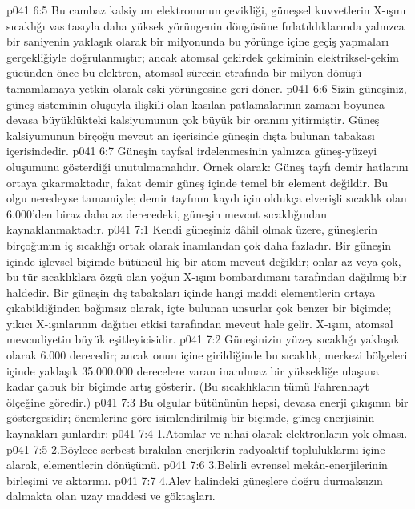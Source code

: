 \vs p041 6:5 Bu cambaz kalsiyum elektronunun çevikliği, güneşsel kuvvetlerin X\hyp{}ışını sıcaklığı vasıtasıyla daha yüksek yörüngenin döngüsüne fırlatıldıklarında yalnızca bir saniyenin yaklaşık olarak bir milyonunda bu yörünge içine geçiş yapmaları gerçekliğiyle doğrulanmıştır; ancak atomsal çekirdek çekiminin elektriksel\hyp{}çekim gücünden önce bu elektron, atomsal sürecin etrafında bir milyon dönüşü tamamlamaya yetkin olarak eski yörüngesine geri döner.
\vs p041 6:6 Sizin güneşiniz, güneş sisteminin oluşuyla ilişkili olan kasılan patlamalarının zamanı boyunca devasa büyüklükteki kalsiyumunun çok büyük bir oranını yitirmiştir. Güneş kalsiyumunun birçoğu mevcut an içerisinde güneşin dışta bulunan tabakası içerisindedir.
\vs p041 6:7 Güneşin tayfsal irdelenmesinin yalnızca güneş\hyp{}yüzeyi oluşumunu gösterdiği unutulmamalıdır. Örnek olarak: Güneş tayfı demir hatlarını ortaya çıkarmaktadır, fakat demir güneş içinde temel bir element değildir. Bu olgu neredeyse tamamiyle; demir tayfının kaydı için oldukça elverişli sıcaklık olan 6.000’den biraz daha az derecedeki, güneşin mevcut sıcaklığından kaynaklanmaktadır.
\vs p041 7:1 Kendi güneşiniz dâhil olmak üzere, güneşlerin birçoğunun iç sıcaklığı ortak olarak inanılandan çok daha fazladır. Bir güneşin içinde işlevsel biçimde bütüncül hiç bir atom mevcut değildir; onlar az veya çok, bu tür sıcaklıklara özgü olan yoğun X\hyp{}ışını bombardımanı tarafından dağılmış bir haldedir. Bir güneşin dış tabakaları içinde hangi maddi elementlerin ortaya çıkabildiğinden bağımsız olarak, içte bulunan unsurlar çok benzer bir biçimde; yıkıcı X\hyp{}ışınlarının dağıtıcı etkisi tarafından mevcut hale gelir. X\hyp{}ışını, atomsal mevcudiyetin büyük eşitleyicisidir.
\vs p041 7:2 Güneşinizin yüzey sıcaklığı yaklaşık olarak 6.000 derecedir; ancak onun içine girildiğinde bu sıcaklık, merkezi bölgeleri içinde yaklaşık 35.000.000 derecelere varan inanılmaz bir yüksekliğe ulaşana kadar çabuk bir biçimde artış gösterir. (Bu sıcaklıkların tümü Fahrenhayt ölçeğine göredir.)
\vs p041 7:3 Bu olgular bütününün hepsi, devasa enerji çıkışının bir göstergesidir; önemlerine göre isimlendirilmiş bir biçimde, güneş enerjisinin kaynakları şunlardır:
\vs p041 7:4 1.\bibnobreakspace Atomlar ve nihai olarak elektronların yok olması.
\vs p041 7:5 2.\bibnobreakspace Böylece serbest bırakılan enerjilerin radyoaktif topluluklarını içine alarak, elementlerin dönüşümü.
\vs p041 7:6 3.\bibnobreakspace Belirli evrensel mekân\hyp{}enerjilerinin birleşimi ve aktarımı.
\vs p041 7:7 4.\bibnobreakspace Alev halindeki güneşlere doğru durmaksızın dalmakta olan uzay maddesi ve göktaşları.
